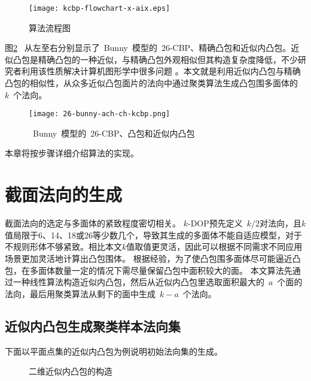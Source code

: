 \begin{figure}[htbp]
    \centering
    \texttt{[image: kcbp-flowchart-x-aix.eps]}
    \caption{算法流程图}
    \label{lbl:kcbp-algorithm-flowchart}
\end{figure}

图\ref{lbl:bunny-26-cbp-ch-ach}~
从左至右分别显示了~Bunny~模型的~26-CBP、精确凸包和近似内凸包。近似凸包是精确凸包的一种近似，与精确凸包外观相似但其构造复杂度降低，不少研究者利用该性质解决计算机图形学中很多问题
\cite{hossain2013constructing}。本文就是利用近似内凸包与精确凸包的相似性，从众多近似凸包面片的法向中通过聚类算法生成凸包围多面体的~$k$~个法向。
\begin{figure}[htbp] %
\centering
\texttt{[image: 26-bunny-ach-ch-kcbp.png]}
\caption{~Bunny~模型的~26-CBP、凸包和近似内凸包}
\label{lbl:bunny-26-cbp-ch-ach}
\end{figure}
本章将按步骤详细介绍算法的实现。

\section{截面法向的生成}
\label{sec:gen-normals}

截面法向的选定与多面体的紧致程度密切相关。
$k$-DOP预先定义~$k/2$对法向，且$k$值局限于6、14、18或26等少数几个，导致其生成的多面体不能自适应模型，对于不规则形体不够紧致。相比本文$k$值取值更灵活，因此可以根据不同需求不同应用场景更加灵活地计算出凸包围体。
根据经验，为了使凸包围多面体尽可能逼近凸包，在多面体数量一定的情况下需尽量保留凸包中面积较大的面。 
本文算法先通过一种线性算法\cite{bentley1982approximation}构造近似内凸包，然后从近似内凸包里选取面积最大的~$a$~个面的法向，最后用聚类算法从剩下的面中生成~$k-a$~个法向。

\subsection{近似内凸包生成聚类样本法向集}
\label{subsec:ach-gen-normals}

下面以平面点集的近似内凸包为例说明初始法向集的生成。
\begin{figure}[htbp]
  \centering
   \hspace{0.5cm}
  \linebreak
   \hspace{0.5cm}
  \hspace{2em}
   \hspace{0.5cm}
  \caption{二维近似内凸包的构造\cite{bentley1982approximation}}
\label{lbl:ach-2d}
\end{figure}

